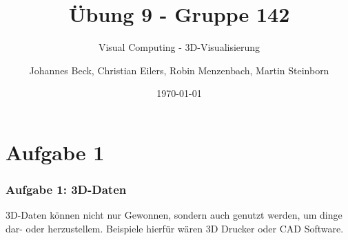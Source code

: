 \documentclass[accentcolor=tud9c,colorbacktitle,inverttitle,landscape,german,presentation,t]{tudbeamer}
\begin{document}
\title{\"Ubung 9 - Gruppe 142}
\subtitle{Visual Computing - 3D-Visualisierung}

\author[Johannes Beck, Christian Eilers, Robin Menzenbach, Martin Steinborn]{Johannes Beck, Christian Eilers, Robin Menzenbach, Martin Steinborn}


\date{\today}

\begin{titleframe}
\end{titleframe}

\section{Aufgabe 1}
	\begin{frame}
		\frametitle{Aufgabe 1: 3D-Daten}
3D-Daten können nicht nur Gewonnen, sondern auch genutzt werden, um dinge dar- oder herzustellem. Beispiele hierfür wären 3D Drucker oder CAD Software.
		
	\end{frame}
\end{document}
